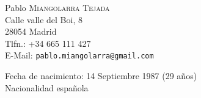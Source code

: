 \label{sec:personal_info}
\noindent\hspace*{\tabcolsep}\begin{minipage}{0.4\linewidth}
{\large Pablo \textsc{Miangolarra Tejada}}\\
Calle valle del Boi, 8\\
28054 Madrid\\[3pt]
Tlfn.: +34 665 111 427\\
E-Mail: \texttt{pablo.miangolarra@gmail.com}
\end{minipage}
\begin{minipage}{0.4\linewidth}
Fecha de nacimiento: 14 Septiembre 1987 (29 años)\\
Nacionalidad española\\
\end{minipage}





